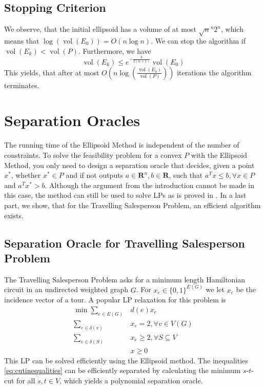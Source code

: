 \documentclass[10pt]{article}
\newcommand{\R}{\mathbf{R}}
\newcommand{\transpose}{T}
\newcommand{\vol}{\operatorname{vol}}
\begin{document}
\subsection{Stopping Criterion}
We observe, that the initial ellipsoid has a volume of at most $\sqrt{n}^{n} 2^n$, which means that $\log (\vol (E_0)) = O(n \log n)$. We can stop the algorithm if $\vol (E_k) < \vol(P)$. Furthermore, we have
\[
\vol (E_k)\le e^{-\frac{k}{2(n+1)}} \vol (E_0)
\]
This yields, that after at most $O(n \log (\frac{\vol (E_0)}{\vol (P)}))$ iterations the algorithm terminates.
\section{Separation Oracles}\label{sec:oracles}
The running time of the Ellipsoid Method is independent of the number of constraints. To solve the feasibility problem for a convex $P$ with the Ellipsoid Method, you only need to design a separation oracle that decides, given a point $x^*$, whether $x^*\in P$ and if not outputs $a \in \R^n, b \in \R$, such that $a^\transpose x \le b, \forall x \in P$ and $a^\transpose x^* > b$. Although the argument from the introduction cannot be made in this case, the method can still be used to solve LPs as is proved in \cite{consequences}. In a last part, we show, that for the Travelling Salesperson Problem, an efficient algorithm exists.
\subsection{Separation Oracle for Travelling Salesperson Problem}\label{subsec:seporacle}
The Travelling Salesperson Problem asks for a minimum length Hamiltonian circuit in an undirected weighted graph $G$. For $x_e \in \{0,1\}^{E(G)}$ we let $x_e$ be the incidence vector of a tour. A popular LP relaxation for this problem is
\begin{align}
\min \sum_{e \in E(G)} &d(e) x_e\nonumber \\
\sum_{e \in \delta (v)}& x_e =2 , \forall v \in V(G) \label{eq:cutinequalities}\\
\sum_{e \in \delta(S)} &x_e \ge 2 , \forall S \subseteq V\nonumber\\
 &x \ge 0\nonumber
\end{align}
This LP can be solved efficiently using the Ellipsoid method. The inequalities \autoref{eq:cutinequalities} can be efficiently separated by calculating the minimum $s$-$t$-cut for all $s,t \in V$, which yields a polynomial separation oracle.


\printbibliography
\end{document}
